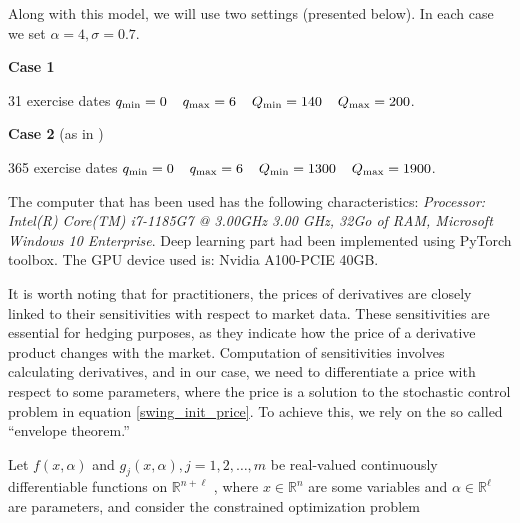 \documentclass{article}
\newcommand{\q}[1]{``#1''}
\renewcommand{\q}[1]{``#1''}
\numberwithin{equation}{section}
\begin{document}
\noindent
Along with this model, we will use two settings (presented below). In each case we set $\alpha = 4, \sigma = 0.7$.

\vspace{0.3cm}

\textbf{Case 1}

\begin{center}
31 exercise dates \hspace{0.4cm} $q_{\min} = 0 \hspace{0.4cm} q_{\max} = 6 \hspace{0.4cm} Q_{\min} = 140 \hspace{0.4cm} Q_{\max} = 200$. 
\end{center}


\textbf{Case 2} (as in \cite{Bardou2009OptimalQF, BarreraEsteve2006NumericalMF})

\begin{center}
365 exercise dates \hspace{0.4cm} $q_{\min} = 0 \hspace{0.4cm} q_{\max} = 6 \hspace{0.4cm} Q_{\min} = 1300 \hspace{0.4cm} Q_{\max} = 1900$.
\end{center}

The computer that has been used has the following characteristics: \textit{Processor: Intel(R) Core(TM) i7-1185G7 @ 3.00GHz   3.00 GHz, 32Go of RAM, Microsoft Windows 10 Enterprise}. Deep learning part had been implemented using PyTorch toolbox. The GPU device used is: Nvidia A100-PCIE 40GB.

\vspace{0.2cm}

It is worth noting that for practitioners, the prices of derivatives are closely linked to their sensitivities with respect to market data. These sensitivities are essential for hedging purposes, as they indicate how the price of a derivative product changes with the market. Computation of sensitivities involves calculating derivatives, and in our case, we need to differentiate a price with respect to some parameters, where the price is a solution to the stochastic control problem in equation \eqref{swing_init_price}. To achieve this, we rely on the so called \q{envelope theorem.}

\vspace{0.2cm}

Let $f(x,\alpha)$ and  $g_{j}(x,\alpha),j=1,2,\ldots ,m$ be real-valued continuously differentiable functions on $\mathbb{R}^{n+\ell}$ , where $x\in \mathbb {R} ^{n}$ are some variables and $\alpha \in \mathbb {R}^{\ell}$ are parameters, and consider the constrained optimization problem
\end{document}
